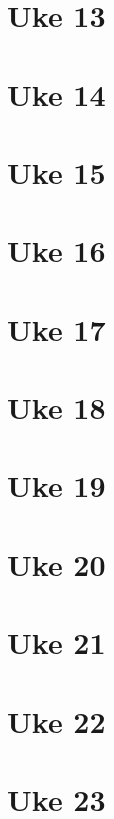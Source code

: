 \documentclass{article}
\begin{document}
  \section{Uke 13}
  \section{Uke 14}
  \section{Uke 15}
  \section{Uke 16}
  \section{Uke 17}
  \section{Uke 18}
  \section{Uke 19}
  \section{Uke 20}
  \section{Uke 21}
  \section{Uke 22}
  \section{Uke 23}
\end{document}
